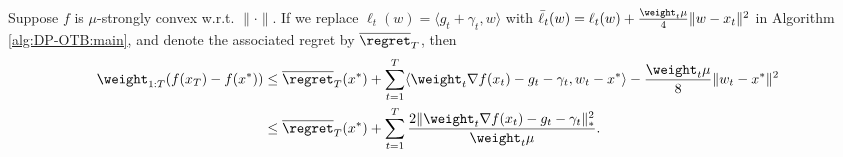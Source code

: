 \begin{lemma}
\label{lem:DP-OTB:strongly-convex-regularized-loss}
Suppose $f$ is $\mu$-strongly convex w.r.t. $\|\cdot\|$. If we replace $\ell_t(w)=\langle g_t+\gamma_t,w\rangle$ with $\bar \ell_t(w)=\ell_t(w)+\frac{\weight_t\mu}{4}\|w-x_t\|^2$ in Algorithm \ref{alg:DP-OTB:main}, and denote the associated regret by $\overline \regret_T$, then
\begin{align*}
    \weight_{1:T} ( f(x_T) -  f(x^*))
    &\leq \overline\regret _T(x^*) +\sum_{t=1}^T \langle \weight_t\nabla f(x_t)-g_t-\gamma_t, w_t-x^*\rangle - \frac{\weight_t\mu}{8}\|w_t-x^*\|^2 \\
    &\leq \overline\regret_T(x^*) + \sum_{t=1}^T \frac{2\|\weight_t\nabla f(x_t)-g_t-\gamma_t\|_*^2}{\weight_t \mu}.
\end{align*}
\end{lemma}